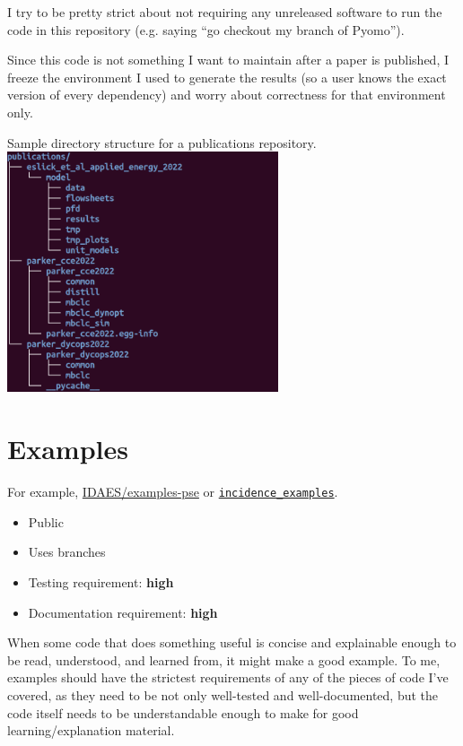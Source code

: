 \documentclass{article}
\begin{document}
I try to be pretty strict about not requiring any unreleased software
to run the code in this repository (e.g. saying ``go checkout my branch
of Pyomo'').

Since this code is not something I want to maintain after a paper is
published, I freeze the environment I used to generate the results
(so a user knows the exact version of every dependency)
and worry about correctness for that environment only.

\begin{center}
  Sample directory structure for a publications repository.\\
  \includegraphics[width=8cm]{publications_tree}
\end{center}

\section{Examples}
For example, \href{https://github.com/IDAES/examples-pse}{IDAES/examples-pse}
or \href{https://github.com/Robbybp/incidence_examples}{\texttt{incidence\_examples}}.
\begin{itemize}
  \item Public
  \item Uses branches
  \item Testing requirement: {\color{red}\bf high}
  \item Documentation requirement: {\color{red}\bf high}
\end{itemize}

When some code that does something useful is concise and explainable
enough to be read, understood, and learned from, it might make a good
example. To me, examples should have the strictest requirements
of any of the pieces of code I've covered, as they need to be not only
well-tested and well-documented, but the code itself needs to be
understandable enough to make for good learning/explanation material.
\end{document}
